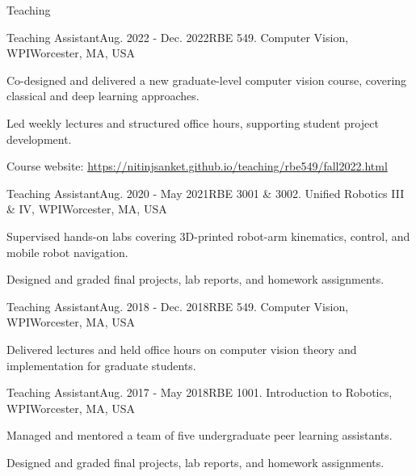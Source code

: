 \documentclass{resume} %
\begin{document}
\begin{rSection}{Teaching}

\begin{rSubsection}
{Teaching Assistant}{Aug. 2022 - Dec. 2022}{RBE 549. Computer Vision, WPI}{Worcester, MA, USA}
\item Co-designed and delivered a new graduate-level computer vision course, covering classical and deep learning approaches.
\item Led weekly lectures and structured office hours, supporting student project development.
\item Course website: \url{https://nitinjsanket.github.io/teaching/rbe549/fall2022.html}
\end{rSubsection}

\begin{rSubsection}
{Teaching Assistant}{Aug. 2020 - May 2021}{RBE 3001 \& 3002. Unified Robotics III \& IV, WPI}{Worcester, MA, USA}
\item Supervised hands-on labs covering 3D-printed robot-arm kinematics, control, and mobile robot navigation.
\item Designed and graded final projects, lab reports, and homework assignments.
\end{rSubsection}

\begin{rSubsection}{Teaching Assistant}{Aug. 2018 - Dec. 2018}{RBE 549. Computer Vision, WPI}{Worcester, MA, USA}
\item Delivered lectures and held office hours on computer vision theory and implementation for graduate students.
\end{rSubsection}

\begin{rSubsection}{Teaching Assistant}{Aug. 2017 - May 2018}{RBE 1001. Introduction to Robotics, WPI}{Worcester, MA, USA}
\item Managed and mentored a team of five undergraduate peer learning assistants.
\item Designed and graded final projects, lab reports, and homework assignments.
\end{rSubsection}

\end{rSection}
\end{document}
